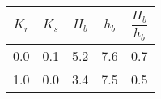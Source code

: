 \begin{tabular}{ccccc}
$K_{r}$ & $K_{s}$ & $H_{b}$ & $h_{b}$ & $\dfrac{H_{b}}{h_{b}}$ \\
\hline
0.0 & 0.1 & 5.2 & 7.6 & 0.7 \\
1.0 & 0.0 & 3.4 & 7.5 & 0.5 \\
\hline
\end{tabular}
